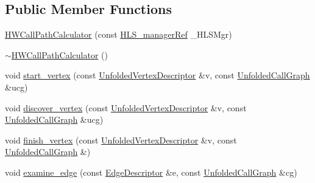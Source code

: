 \subsection*{Public Member Functions}
\begin{DoxyCompactItemize}
\item 
\hyperlink{classHWCallPathCalculator_ac3b39ef9a827f6a1e01e675f713cc493}{H\+W\+Call\+Path\+Calculator} (const \hyperlink{hls__manager_8hpp_acd3842b8589fe52c08fc0b2fcc813bfe}{H\+L\+S\+\_\+manager\+Ref} \+\_\+\+H\+L\+S\+Mgr)
\item 
\hyperlink{classHWCallPathCalculator_a6fe2e7835e140de731dab17331fa8512}{$\sim$\+H\+W\+Call\+Path\+Calculator} ()
\item 
void \hyperlink{classHWCallPathCalculator_a995bb66a575708682644226f3d1e1ecf}{start\+\_\+vertex} (const \hyperlink{UnfoldedCallGraph_8hpp_a6c87395c9d950d587c8e4db39b93e3e2}{Unfolded\+Vertex\+Descriptor} \&v, const \hyperlink{classUnfoldedCallGraph}{Unfolded\+Call\+Graph} \&ucg)
\item 
void \hyperlink{classHWCallPathCalculator_a53001ec23cdf7629228bbca0cb46750f}{discover\+\_\+vertex} (const \hyperlink{UnfoldedCallGraph_8hpp_a6c87395c9d950d587c8e4db39b93e3e2}{Unfolded\+Vertex\+Descriptor} \&v, const \hyperlink{classUnfoldedCallGraph}{Unfolded\+Call\+Graph} \&ucg)
\item 
void \hyperlink{classHWCallPathCalculator_ac39442469f65a16565954434a23a60c7}{finish\+\_\+vertex} (const \hyperlink{UnfoldedCallGraph_8hpp_a6c87395c9d950d587c8e4db39b93e3e2}{Unfolded\+Vertex\+Descriptor} \&v, const \hyperlink{classUnfoldedCallGraph}{Unfolded\+Call\+Graph} \&)
\item 
void \hyperlink{classHWCallPathCalculator_a907a8d0f033b3d51c8499ffcd4070bc3}{examine\+\_\+edge} (const \hyperlink{graph_8hpp_a9eb9afea34e09f484b21f2efd263dd48}{Edge\+Descriptor} \&e, const \hyperlink{classUnfoldedCallGraph}{Unfolded\+Call\+Graph} \&cg)
\end{DoxyCompactItemize}
